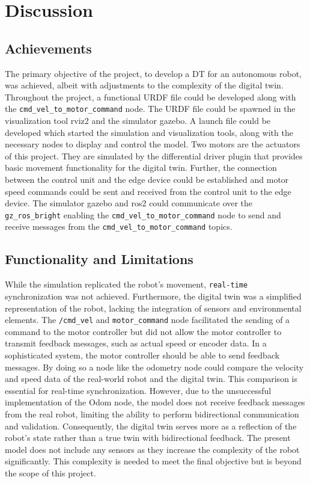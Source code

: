 \chapter{Discussion}

\section{Achievements}

The primary objective of the project, to develop a DT for an autonomous robot, was achieved, albeit with adjustments to the complexity of the digital twin. Throughout the project, a functional URDF file could be developed along with the \verb|cmd_vel_to_motor_command| node. The URDF file could be spawned in the visualization tool rviz2 and the simulator gazebo.  
A launch file could be developed which started the simulation and visualization tools, along with the necessary nodes to display and control the model. 
Two motors are the actuators of this project. They are simulated by the differential driver plugin that provides basic movement functionality for the digital twin.  
Further, the connection between the control unit and the edge device could be established and motor speed commands could be sent and received from the control unit to the edge device. The simulator gazebo and ros2 could communicate over the \verb|gz_ros_bright| enabling the \verb|cmd_vel_to_motor_command| node to send and receive messages from the \verb|cmd_vel_to_motor_command| topics. 

\section{Functionality and Limitations}

While the simulation replicated the robot's movement, \verb|real-time| synchronization was not achieved. Furthermore, the digital twin was a simplified representation of the robot, lacking the integration of sensors and environmental elements. The \verb|/cmd_vel| and \verb|motor_command| node facilitated the sending of a command to the motor controller but did not allow the motor controller to transmit feedback messages, such as actual speed or encoder data. In a sophisticated system, the motor controller should be able to send feedback messages. By doing so a node like the odometry node could compare the velocity and speed data of the real-world robot and the digital twin. This comparison is essential for real-time synchronization. However, due to the unsuccessful implementation of the Odom node, the model does not receive feedback messages from the real robot, limiting the ability to perform bidirectional communication and validation. Consequently, the digital twin serves more as a reflection of the robot's state rather than a true twin with bidirectional feedback. 
The present model does not include any sensors as they increase the complexity of the robot significantly. This complexity is needed to meet the final objective but is beyond the scope of this project.


